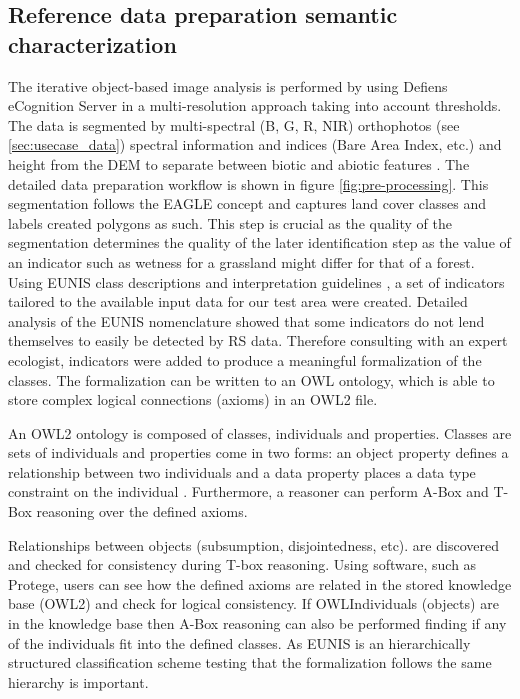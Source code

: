 \documentclass[authoryear, review,12pt,number]{elsarticle}
\begin{document}
\label{subsec:reference_data_and_semantic_characterisation} 
\subsection{Reference data preparation semantic characterization}
The iterative object-based image analysis is performed by \cite{Tintrup2015} 
using Defiens eCognition Server in a multi-resolution approach 
\citep{baatz2001ecognition} taking into account thresholds. The data is 
segmented by multi-spectral (B, G, R, NIR) orthophotos (see 
\ref{sec:usecase_data}) spectral information and indices (Bare Area Index, 
etc.) and height from the DEM to separate between biotic and abiotic features 
\citep{Tintrup2015}. The detailed data preparation workflow is shown in figure 
\ref{fig:pre-processing}. This segmentation follows the EAGLE concept and
captures land cover classes and labels created polygons as such. This step is
crucial as the quality of the segmentation determines the quality of the later
identification step as the value of an indicator such as wetness for a grassland
might differ for that of a forest. Using EUNIS class descriptions and
interpretation guidelines \citep{EUNISManual}, a set of indicators tailored to
the available input data for our test area were created. Detailed analysis of
the EUNIS nomenclature showed that some indicators do not lend themselves to
easily be detected by RS data. Therefore consulting with an expert ecologist,
indicators were added to produce a meaningful formalization of the classes. The
formalization can be written to an OWL ontology, which is able to store complex
logical connections (axioms) in an OWL2 file.

An OWL2 ontology is composed of classes, individuals and properties. Classes are
sets of individuals and properties come in two forms: an object property defines
a relationship between two individuals and a data property  places a data type
constraint on the individual \citep{OWL2}. Furthermore, a reasoner can perform
A-Box and T-Box reasoning over the defined axioms. 

Relationships between objects (subsumption, disjointedness, etc). are discovered
and checked for consistency during T-box reasoning. Using software, such as
Protege, users can see how the defined axioms are related in the stored
knowledge base (OWL2) and check for logical consistency. If OWLIndividuals
(objects) are in the knowledge base then A-Box reasoning can also be performed
finding if any of the individuals fit into the defined classes. As EUNIS is an
hierarchically structured classification scheme testing that the formalization
follows the same hierarchy is important. 
\end{document}
